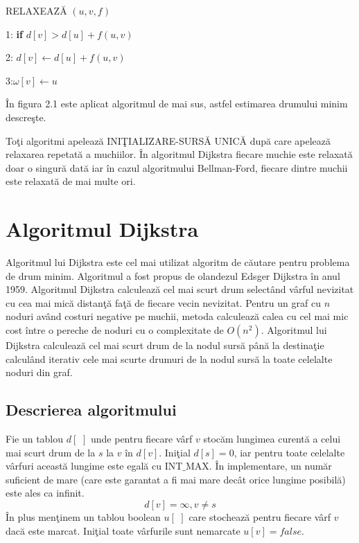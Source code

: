 \documentclass[11pt,a4paper]{report}
\begin{document}
      	\vspace{0.3cm}
    RELAXEAZ\u A $(u,v,f)$
    
    \vspace{0.1cm}
    1: \textbf{if} $d[v] > d[u] + f(u,v)$ 
    
    2: \hspace{0.5cm}$d[v]\longleftarrow d[u] + f(u,v)$
    
    3:\hspace{0.6cm}$\omega[v]\longleftarrow u$
    
          	\vspace{0.3cm}
    \^ In figura 2.1 este aplicat algoritmul de mai sus, astfel estimarea drumului minim descre\c ste.
    
    To\c ti algoritmi apeleaz\u a INI\c TIALIZARE-SURS\u A UNIC\u A dup\u a care apeleaz\u a relaxarea repetat\u a a muchiilor. \^ In algoritmul Dijkstra fiecare muchie este relaxat\u a doar o singur\u a dat\u a iar \^ in cazul algoritmului Bellman-Ford, fiecare dintre muchii este relaxat\u a de mai multe ori.
    
    \section{Algoritmul Dijkstra}
    
    Algoritmul lui Dijkstra este cel mai utilizat algoritm de c\u autare pentru problema de drum minim. Algoritmul a fost propus de olandezul Edsger Dijkstra \^ in anul 1959. Algoritmul Dijkstra calculeaz\u a cel mai scurt drum  select\^ and v\^ arful nevizitat cu cea mai mic\u a distan\c t\u a fa\c t\u a de fiecare vecin nevizitat. Pentru un graf cu $n$ noduri av\^ and costuri negative pe muchii, metoda calculeaz\u a calea cu cel mai mic cost \^ intre o pereche de noduri cu o complexitate de $O(n^2)$. Algoritmul lui Dijkstra calculeaz\u a cel mai scurt drum de la nodul surs\u a p\^ an\u a la destina\c tie calcul\^ and iterativ cele mai scurte drumuri de la nodul surs\u a la toate celelalte noduri din graf.
    
    \subsection{Descrierea algoritmului}
    Fie un tablou $d[\,\,]$ unde pentru fiecare v\^ arf $v$ stoc\u am lungimea curent\u a a celui mai scurt drum de la $s$ la $v$ \^ in $d[v]$. Ini\c tial $d[s]=0$, iar pentru toate celelalte v\^ arfuri aceast\u a lungime este egal\u a cu INT$\_$MAX. \^ In implementare, un num\u ar suficient de mare (care este garantat a fi mai mare dec\^ at orice lungime posibil\u a) este ales ca infinit.
    \begin{equation*}
    d[v]=\infty,v\neq s
    \end{equation*}
    \^ In plus men\c tinem un tablou boolean $u[\,\,]$ care stocheaz\u a pentru fiecare v\^ arf $v$ dac\u a este marcat. Ini\c tial toate v\^ arfurile sunt nemarcate $u[v]=false$.
    
\end{document}
